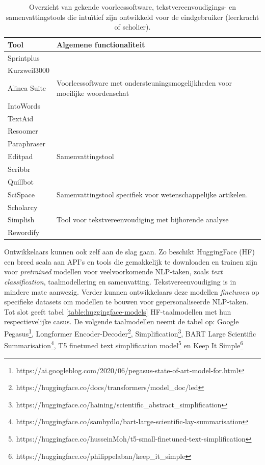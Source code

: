 \begin{center}
	\begin{table}[H]
		\begin{tabular}{ | m{4cm} | m{11cm} | } 
		\hline
		\textbf{Tool} & \textbf{Algemene functionaliteit} \\
		\hline
		Sprintplus & \\
		Kurzweil3000 & \\
		Alinea Suite & Voorleessoftware met ondersteuningsmogelijkheden voor moeilijke woordenschat \\
		IntoWords & \\
		TextAid & \\
		\hline
		Resoomer &  \\
		Paraphraser & \\
		Editpad & Samenvattingstool \\
		Scribbr & \\
		Quillbot & \\
		\hline
		SciSpace & Samenvattingstool specifiek voor wetenschappelijke artikelen. \\
		Scholarcy & \\
		\hline
		Simplish & Tool voor tekstvereenvoudiging met bijhorende analyse\\
		Rewordify & \\
		\hline
		\end{tabular}
	\caption{Overzicht van gekende voorleessoftware, tekstvereenvoudigings- en samenvattingstools die intuïtief zijn ontwikkeld voor de eindgebruiker (leerkracht of scholier).}
	\label{table:overview-tools}
	\end{table}
\end{center}

Ontwikkelaars kunnen ook zelf aan de slag gaan. Zo beschikt HuggingFace (HF) een breed scala aan API's en tools die gemakkelijk te downloaden en trainen zijn voor \textit{pretrained} modellen voor veelvoorkomende NLP-taken, zoals \textit{text classification}, taalmodellering en samenvatting. Tekstvereenvoudiging is in mindere mate aanwezig. Verder kunnen ontwikkelaars deze modellen \textit{finetunen} op specifieke datasets om modellen te bouwen voor gepersonaliseerde NLP-taken. Tot slot geeft tabel \ref{table:huggingface-models} HF-taalmodellen met hun respectievelijke casus. De volgende taalmodellen neemt de tabel op: Google Pegasus\footnote{https://ai.googleblog.com/2020/06/pegasus-state-of-art-model-for.html}, Longformer Encoder-Decoder\footnote{https://huggingface.co/docs/transformers/model\_doc/led}, Simplification\footnote{https://huggingface.co/haining/scientific\_abstract\_simplification}, BART Large Scientific Summarisation\footnote{https://huggingface.co/sambydlo/bart-large-scientific-lay-summarisation}, T5 finetuned text simplification model\footnote{https://huggingface.co/husseinMoh/t5-small-finetuned-text-simplification} en Keep It Simple\footnote{https://huggingface.co/philippelaban/keep\_it\_simple}

